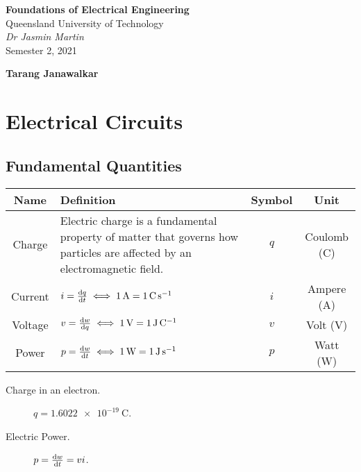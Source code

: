 \documentclass{article}
\date{}
\newcommand{\uniTitle}{Queensland University of Technology}
\newcommand{\className}{Foundations of Electrical Engineering}
\newcommand{\classTime}{Semester 2, 2021}
\newcommand{\classInstructorName}{Dr Jasmin Martin}
\newcommand{\authorName}{Tarang Janawalkar}
\begin{document}
\begin{titlepage}
    \vspace*{\fill}
	\begin{center}
        \LARGE
        \textbf{\className}
        \texorpdfstring{\\}{ }
        \uniTitle
        \texorpdfstring{\\}{ }
        \texorpdfstring{\vspace{0.3in}}{ }
        \normalsize\textit{\classInstructorName}
        \texorpdfstring{\\}{ }
        \classTime
    \end{center}
    \begin{center}
        \textbf{\authorName}
    \end{center}
    \vspace*{\fill}
    \doclicenseThis
    \thispagestyle{empty}
\end{titlepage}
\newpage

\tableofcontents
\newpage

\section{Electrical Circuits}
\subsection{Fundamental Quantities}
\begingroup
\renewcommand{\arraystretch}{1.5}
\begin{table}[H]
    \centering
    \begin{tabular}{c | >{\centering}p{} | c c}
        \toprule
        \textbf{Name} & \textbf{Definition} & \textbf{Symbol} & \textbf{Unit} \\
        \midrule
        Charge & Electric charge is a fundamental property of matter that governs how particles are affected by an electromagnetic field.
        & $q$ & Coulomb (\unit{\coulomb}) \\
        \hline
        Current & $i=\dv{q}{t}\iff\SI{1}{\ampere}=\SI{1}{\coulomb\per\s}$
        & $i$ & Ampere (\unit{\ampere}) \\
        \hline
        Voltage & $v=\dv{w}{q}\iff\SI{1}{\volt}=\SI{1}{\joule\per\coulomb}$
        & $v$ & Volt (\unit{\volt}) \\
        \hline
        Power & $p=\dv{w}{t}\iff\SI{1}{\watt}=\SI{1}{\joule\per\s}$
        & $p$ & Watt (\unit{\watt}) \\
        \bottomrule
    \end{tabular}
\end{table}
\endgroup
\begin{description}
    \item[Charge in an electron.] $q=\SI{1.6022e-19}{\coulomb}$.
    \item[Electric Power.] $p=\dv{w}{t}=vi$. 
\end{description}
\end{document}
